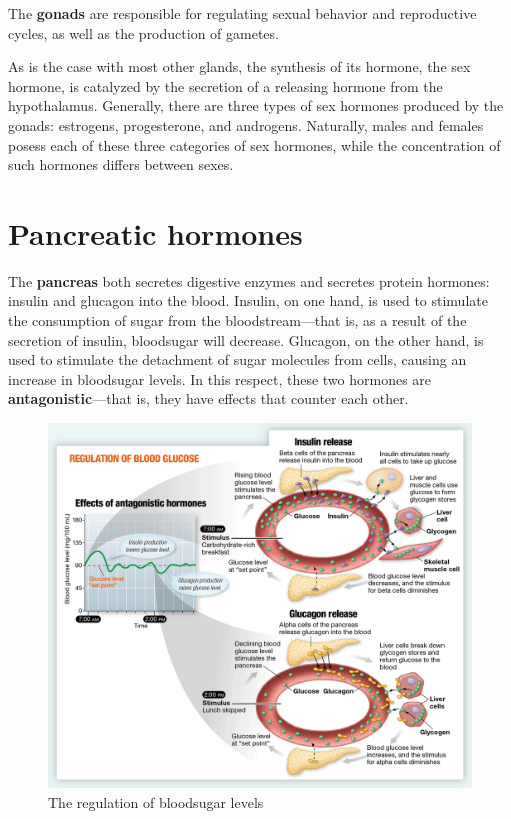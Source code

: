\documentclass{article}
\begin{document}
The \textbf{gonads} are responsible for regulating sexual behavior and
reproductive cycles, as well as the production of gametes.

As is the case with most other glands, the synthesis of its hormone, the sex
hormone, is catalyzed by the secretion of a releasing hormone from the
hypothalamus. Generally, there are three types of sex hormones produced by
the gonads: estrogens, progesterone, and androgens. Naturally, males and
females posess each of these three categories of sex hormones, while the
concentration of such hormones differs between sexes.

\section{Pancreatic hormones}

The \textbf{pancreas} both secretes digestive enzymes and secretes protein
hormones: insulin and glucagon into the blood. Insulin, on one hand, is used
to stimulate the consumption of sugar from the bloodstream---that is, as a result
of the secretion of insulin, bloodsugar will decrease. Glucagon, on the other hand,
is used to stimulate the detachment of sugar molecules from cells, causing an increase
in bloodsugar levels. In this respect, these two hormones are
\textbf{antagonistic}---that is, they have effects that counter each other.

\bigbreak{}

\begin{figure}[h]
	\centering
	\includegraphics[width=0.8\linewidth]{insulin.png}
	\caption{The regulation of bloodsugar levels}
\end{figure}
\end{document}
